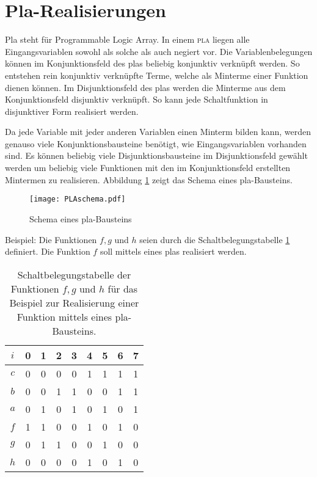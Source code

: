 \section{{\sc Pla}-Realisierungen}
{\sc Pla} steht für Programmable Logic Array. In einem \textsc{pla} liegen alle Eingangsvariablen sowohl als solche als auch negiert vor. Die Variablenbelegungen können im Konjunktionsfeld des {\sc pla}s beliebig konjunktiv verknüpft werden. So entstehen rein konjunktiv verknüpfte Terme, welche als Minterme einer Funktion dienen können. Im Disjunktionsfeld des {\sc pla}s werden die Minterme aus dem Konjunktionsfeld disjunktiv verknüpft. So kann jede Schaltfunktion in disjunktiver Form realisiert werden.

Da jede Variable mit jeder anderen Variablen einen Minterm bilden kann, werden genauso viele Konjunktionsbausteine benötigt, wie Eingangsvariablen vorhanden sind. Es können beliebig viele Disjunktionsbausteine im Disjunktionsfeld gewählt werden um beliebig viele Funktionen mit den im Konjunktionsfeld erstellten Mintermen zu realisieren. Abbildung \ref{PLAschem} zeigt das Schema eines {\sc pla}-Bausteins.  
\begin{figure}[htp]
	\centering
	\texttt{[image: PLAschema.pdf]}
	\caption{Schema eines {\sc pla}-Bausteins}
	\label{PLAschem}
\end{figure}

Beispiel: Die Funktionen $f, g$ und $h$ seien durch die Schaltbelegungstabelle \ref{PlaBspSBT} definiert. Die Funktion $f$ soll mittels eines {\sc pla}s realisiert werden.
\begin{table}[htp]
\centering
\begin{tabular}{*{9}{c}}
$i$ & 0 & 1 & 2 & 3 & 4 & 5 & 6 & 7 \\ \hline
$c$ & 0 & 0 & 0 & 0 & 1 & 1 & 1 & 1 \\
$b$ & 0 & 0 & 1 & 1 & 0 & 0 & 1 & 1 \\
$a$ & 0 & 1 & 0 & 1 & 0 & 1 & 0 & 1 \\ \hline
$f$ & 1 & 1 & 0 & 0 & 1 & 0 & 1 & 0 \\ \hline
$g$ & 0 & 1 & 1 & 0 & 0 & 1 & 0 & 0 \\ \hline
$h$ & 0 & 0 & 0 & 0 & 1 & 0 & 1 & 0 \\
\end{tabular}
\caption{Schaltbelegungstabelle der Funktionen $f, g$ und $h$ für das Beispiel zur Realisierung einer Funktion mittels eines {\sc pla}-Bausteins.}
\label{PlaBspSBT}
\end{table}


